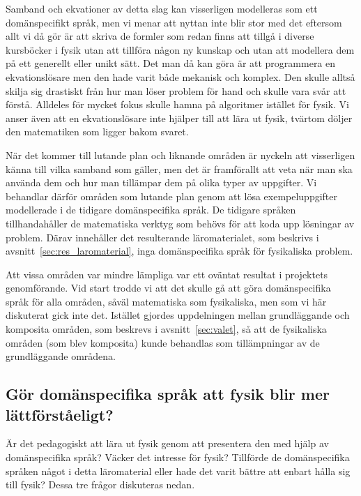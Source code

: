 Samband och ekvationer av detta slag kan visserligen modelleras som ett domänspecifikt
språk, men vi menar att nyttan inte blir stor med det eftersom allt vi då gör är
att skriva de formler som redan finns att tillgå i diverse kursböcker i fysik
utan att tillföra någon ny kunskap och utan att modellera dem på ett generellt
eller unikt sätt. Det man då kan göra är att programmera en ekvationslösare men
den hade varit både mekanisk och komplex. Den skulle alltså skilja sig
drastiskt från hur man löser problem för hand och skulle vara svår att förstå.
Alldeles för mycket fokus skulle hamna på algoritmer istället för fysik. Vi
anser även att en ekvationslösare inte hjälper till att lära ut fysik, tvärtom
döljer den matematiken som ligger bakom svaret.

När det kommer till lutande plan och liknande områden är nyckeln att visserligen
känna till vilka samband som gäller, men det är framförallt att veta när man ska
använda dem och hur man tillämpar dem på olika typer av uppgifter. Vi behandlar
därför områden som lutande plan genom att lösa exempeluppgifter modellerade i de
tidigare domänspecifika språk. De tidigare språken tillhandahåller de matematiska
verktyg som behövs för att koda upp lösningar av problem. Därav innehåller det
resulterande läromaterialet, som beskrivs i avsnitt~\ref{sec:res_laromaterial},
inga domänspecifika språk för fysikaliska problem.

Att vissa områden var mindre lämpliga var ett oväntat resultat i projektets
genomförande. Vid start trodde vi att det skulle gå att göra domänspecifika
språk för alla områden, såväl matematiska som fysikaliska, men som vi här
diskuterat gick inte det. Istället gjordes uppdelningen mellan grundläggande och
komposita områden, som beskrevs i avsnitt~\ref{sec:valet}, så att de fysikaliska
områden (som blev komposita) kunde behandlas som tillämpningar av de
grundläggande områdena.

\subsection{Gör domänspecifika språk att fysik blir mer lättförståeligt?}\label{sec:bara_fysik}

Är det pedagogiskt att lära ut fysik genom att presentera den med hjälp av
domänspecifika språk? Väcker det intresse för fysik? Tillförde de domänspecifika
språken något i detta läromaterial eller hade det varit bättre att enbart hålla
sig till fysik? Dessa tre frågor diskuteras nedan.

